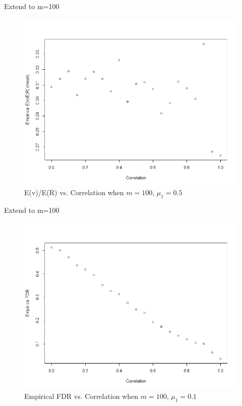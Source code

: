 \documentclass{beamer}
\begin{document}
\begin{frame}[t]{Extend to m=100}\vspace{10pt}

\begin{figure}[h]
	\centering
	\includegraphics[scale=0.35]{EvEr_m=100_1}
	\caption{\footnotesize{E(v)/E(R) vs. Correlation when $m=100$, $\mu_1=0.5$}}
	\label{fig8}
\end{figure}

\end{frame}

\begin{frame}[t]{Extend to m=100}\vspace{10pt}

\begin{figure}[h]
	\centering
	\includegraphics[scale=0.35]{fdrVSrho_m=100_2}
	\caption{\footnotesize{Empirical FDR vs. Correlation when $m=100$, $\mu_1=0.1$}}
	\label{fig7}
\end{figure}

\end{frame}
\end{document}
